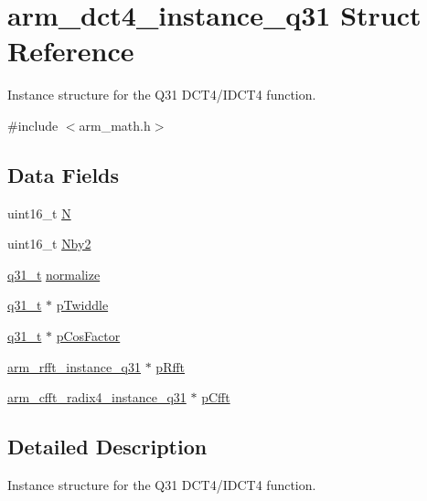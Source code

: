 \hypertarget{structarm__dct4__instance__q31}{}\section{arm\+\_\+dct4\+\_\+instance\+\_\+q31 Struct Reference}
\label{structarm__dct4__instance__q31}


Instance structure for the Q31 D\+C\+T4/\+I\+D\+C\+T4 function.  




{\ttfamily \#include $<$arm\+\_\+math.\+h$>$}

\subsection*{Data Fields}
\begin{DoxyCompactItemize}
\item 
uint16\+\_\+t \hyperlink{structarm__dct4__instance__q31_a37d49571fe35012087153c093705cd11}{N}
\item 
uint16\+\_\+t \hyperlink{structarm__dct4__instance__q31_afa64b1618089e35c2b55cff71cb29715}{Nby2}
\item 
\hyperlink{arm__math_8h_adc89a3547f5324b7b3b95adec3806bc0}{q31\+\_\+t} \hyperlink{structarm__dct4__instance__q31_a3a2f571658a202a38fa508098001b47c}{normalize}
\item 
\hyperlink{arm__math_8h_adc89a3547f5324b7b3b95adec3806bc0}{q31\+\_\+t} $\ast$ \hyperlink{structarm__dct4__instance__q31_a2505b7d5ec077b244c712797a5253b6d}{p\+Twiddle}
\item 
\hyperlink{arm__math_8h_adc89a3547f5324b7b3b95adec3806bc0}{q31\+\_\+t} $\ast$ \hyperlink{structarm__dct4__instance__q31_af06acf18dc6547fc29aba2eb68cc63f0}{p\+Cos\+Factor}
\item 
\hyperlink{structarm__rfft__instance__q31}{arm\+\_\+rfft\+\_\+instance\+\_\+q31} $\ast$ \hyperlink{structarm__dct4__instance__q31_a16c74f8496e1691e62da3c57e0c676eb}{p\+Rfft}
\item 
\hyperlink{structarm__cfft__radix4__instance__q31}{arm\+\_\+cfft\+\_\+radix4\+\_\+instance\+\_\+q31} $\ast$ \hyperlink{structarm__dct4__instance__q31_a0b1f4a05c1824bab3b9bd837a260232a}{p\+Cfft}
\end{DoxyCompactItemize}


\subsection{Detailed Description}
Instance structure for the Q31 D\+C\+T4/\+I\+D\+C\+T4 function. 

